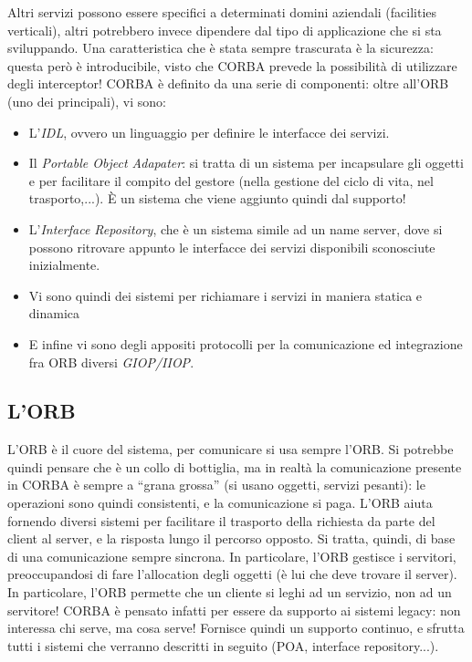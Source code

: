 Altri servizi possono essere specifici a determinati domini aziendali (facilities verticali), altri potrebbero invece dipendere dal tipo di
applicazione che si sta sviluppando.
Una caratteristica che è stata sempre trascurata è la sicurezza: questa però è introducibile, visto che CORBA prevede
la possibilità di utilizzare degli interceptor!
CORBA è definito da una serie di componenti: oltre all'ORB (uno dei principali), vi sono:
\begin{itemize}
 \item L'\textit{IDL}, ovvero un linguaggio per definire le interfacce dei servizi.
 \item Il \textit{Portable Object Adapater}: si tratta di un sistema per incapsulare gli oggetti e per facilitare il
compito del gestore (nella gestione del ciclo di vita, nel trasporto,...). È un sistema che viene aggiunto quindi dal supporto!
 \item L'\textit{Interface Repository}, che è un sistema simile ad un name server, dove si possono ritrovare appunto le interfacce dei servizi disponibili sconosciute inizialmente.
 \item Vi sono quindi dei sistemi per richiamare i servizi in maniera statica e dinamica
 \item E infine vi sono degli appositi protocolli per la comunicazione ed integrazione fra ORB diversi \textit{GIOP/IIOP}.
\end{itemize}
\subsection{L'ORB}
L'ORB è il cuore del sistema, per comunicare si usa sempre l'ORB. Si potrebbe quindi pensare che è un collo di
bottiglia, ma in realtà la comunicazione presente in CORBA è sempre a ``grana grossa'' (si usano oggetti, servizi
pesanti): le operazioni sono quindi consistenti, e la comunicazione si paga. L'ORB aiuta fornendo diversi sistemi per
facilitare il trasporto della richiesta da parte del client al server, e la risposta lungo il percorso opposto. Si
tratta, quindi, di base di una comunicazione sempre sincrona.
In particolare, l'ORB gestisce i servitori, preoccupandosi di fare l'allocation degli oggetti (è lui che deve trovare il
server). In particolare, l'ORB permette che un cliente si leghi ad un servizio, non ad un servitore! CORBA è pensato
infatti per essere da supporto ai sistemi legacy: non interessa chi serve, ma cosa serve! Fornisce quindi un supporto
continuo, e sfrutta tutti i sistemi che verranno descritti in seguito (POA, interface repository...).
